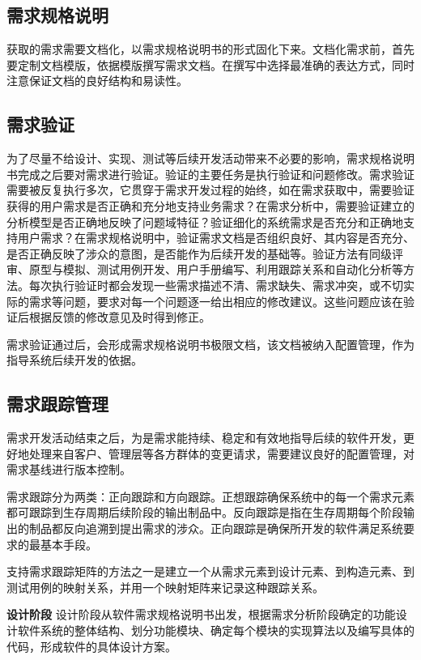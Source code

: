 \documentclass[UTF8,nofonts]{ctexart}
\makeatletter
\renewcommand{\section}{\@startsection{section}{1}{0mm}
  {-\baselineskip}{0.5\baselineskip}{\fontsize{16pt}{16pt}\bf\leftline}}
\makeatother
\begin{document}
\subsection{\textbf{需求规格说明}}
获取的需求需要文档化，以需求规格说明书的形式固化下来。文档化需求前，首先要定制文档模版，依据模版撰写需求文档。在撰写中选择最准确的表达方式，同时注意保证文档的良好结构和易读性。
\subsection{\textbf{需求验证}}
为了尽量不给设计、实现、测试等后续开发活动带来不必要的影响，需求规格说明书完成之后要对需求进行验证。验证的主要任务是执行验证和问题修改。需求验证需要被反复执行多次，它贯穿于需求开发过程的始终，如在需求获取中，需要验证获得的用户需求是否正确和充分地支持业务需求？在需求分析中，需要验证建立的分析模型是否正确地反映了问题域特征？验证细化的系统需求是否充分和正确地支持用户需求？在需求规格说明中，验证需求文档是否组织良好、其内容是否充分、是否正确反映了涉众的意图，是否能作为后续开发的基础等。验证方法有同级评审、原型与模拟、测试用例开发、用户手册编写、利用跟踪关系和自动化分析等方法。每次执行验证时都会发现一些需求描述不清、需求缺失、需求冲突，或不切实际的需求等问题，要求对每一个问题逐一给出相应的修改建议。这些问题应该在验证后根据反馈的修改意见及时得到修正。

需求验证通过后，会形成需求规格说明书极限文档，该文档被纳入配置管理，作为指导系统后续开发的依据。
\subsection{\textbf{需求跟踪管理}}
需求开发活动结束之后，为是需求能持续、稳定和有效地指导后续的软件开发，更好地处理来自客户、管理层等各方群体的变更请求，需要建议良好的配置管理，对需求基线进行版本控制。

需求跟踪分为两类：正向跟踪和方向跟踪。正想跟踪确保系统中的每一个需求元素都可跟踪到生存周期后续阶段的输出制品中。反向跟踪是指在生存周期每个阶段输出的制品都反向追溯到提出需求的涉众。正向跟踪是确保所开发的软件满足系统要求的最基本手段。

支持需求跟踪矩阵的方法之一是建立一个从需求元素到设计元素、到构造元素、到测试用例的映射关系，并用一个映射矩阵来记录这种跟踪关系。
\section{\textbf{设计阶段}}
设计阶段从软件需求规格说明书出发，根据需求分析阶段确定的功能设计软件系统的整体结构、划分功能模块、确定每个模块的实现算法以及编写具体的代码，形成软件的具体设计方案。
\end{document}
